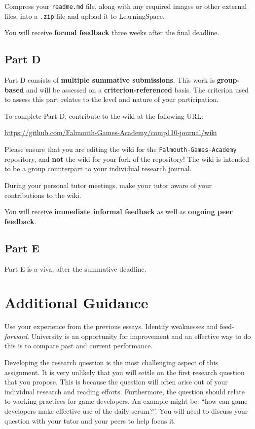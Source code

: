 \documentclass{../fal_assignment}
\begin{document}
Compress your \texttt{readme.md} file, along with any required images or other external files,
into a \texttt{.zip} file and upload it to LearningSpace.

You will receive \textbf{formal feedback} three weeks after the final deadline.

\subsection*{Part D}

Part D consists of \textbf{multiple summative submissions}. This work is \textbf{group-based} and will be assessed on a \textbf{criterion-referenced} basis.
The criterion used to assess this part relates to the level and nature of your participation.

To complete Part D, contribute to the wiki at the following URL:

\url{https://github.com/Falmouth-Games-Academy/comp110-journal/wiki}

Please ensure that you are editing the wiki for the \texttt{Falmouth-Games-Academy} repository,
and \textbf{not} the wiki for your fork of the repository!
The wiki is intended to be a group counterpart to your individual research journal. 

During your personal tutor meetings, make your tutor aware of your contributions to the wiki.

You will receive \textbf{immediate informal feedback} as well as \textbf{ongoing peer feedback}.

\subsection*{Part E}

Part E is a viva, after the summative deadline. 

\section*{Additional Guidance}

Use your experience from the previous essays. Identify weaknesses and feed-\textit{forward}. University is an opportunity for improvement and an effective way to do this is to compare past and current performance.

Developing the research question is the most challenging aspect of this assignment. It is very unlikely that you will settle on the first research question that you propose. This is because the question will often arise out of your individual research and reading efforts. Furthermore, the question should relate to working practices for game developers. An example might be: ``how can game developers make effective use of the daily scrum?''. You will need to discuss your question with your tutor and your peers to help focus it.
\end{document}
